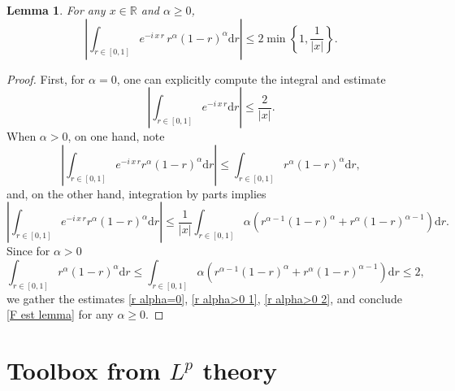 \documentclass[11pt,a4paper]{amsart}
\newcommand{\md}{\mathrm{d}}
\newtheorem{lemma}[theorem]{Lemma}
\begin{document}
\begin{lemma}\label{Lemma F est} 
	For any $x \in \mathbb{R}$ and $\alpha\geq 0$,
	\begin{equation}\label{F est lemma}
		\left| \int_{r\in[0,1]} e^{-i  \, x \, r} \,  r^\alpha(1-r)^\alpha \md r  \right| \leq  2 \min \left\{ 1, \frac{1}{|x|} \right\}.
	\end{equation}
\end{lemma}
\begin{proof}
	First, for $\alpha=0$, one can explicitly compute the integral and estimate
	\begin{equation}\label{r alpha=0}
		\left| \int_{r\in[0,1]} e^{-i \, x  \, r}    \md r  \right| \leq  \frac{2}{|x|}.
	\end{equation}
	When $\alpha>0$, on one hand, note
	\begin{equation}\label{r alpha>0 1}
		\left| \int_{r\in[0,1]} e^{-i \, x \, r }  r^\alpha(1-r)^\alpha \md r \right| \leq  \int_{r\in[0,1]}  r^\alpha(1-r)^\alpha \md r,
	\end{equation}
	and, on the other hand,  integration by parts implies
	\begin{equation}\label{r alpha>0 2}
		\left| \int_{r\in[0,1]} e^{-i \,  x\,  r }  r^\alpha(1-r)^\alpha \md r  \right| \leq  \frac{1}{|x|  }  \int_{r\in[0,1]} \alpha \left( r^{\alpha-1}(1-r)^\alpha + r^\alpha (1-r)^{\alpha-1} \right) \md r.
	\end{equation}
	Since for $\alpha>0$
	\begin{equation*}
		\int_{r\in[0,1]}  r^\alpha(1-r)^\alpha \md r \leq \int_{r\in[0,1]} \alpha \left( r^{\alpha-1}(1-r)^\alpha + r^\alpha (1-r)^{\alpha-1} \right) \md r \leq 2,
	\end{equation*}
	we   gather the estimates  \eqref{r alpha=0}, \eqref{r alpha>0 1}, \eqref{r alpha>0 2}, and conclude \eqref{F est lemma} for any $\alpha\geq 0$.
\end{proof}


\section{Toolbox from $L^p$ theory}
\end{document}

